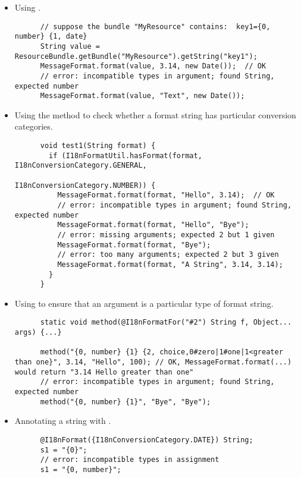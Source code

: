 \begin{itemize}
  \item Using .
\begin{Verbatim}
      // suppose the bundle "MyResource" contains:  key1={0, number} {1, date}
      String value = ResourceBundle.getBundle("MyResource").getString("key1");
      MessageFormat.format(value, 3.14, new Date());  // OK
      // error: incompatible types in argument; found String, expected number
      MessageFormat.format(value, "Text", new Date());
\end{Verbatim}
  \item Using the
    method to check whether a format
    string has particular conversion categories.
\begin{Verbatim}
      void test1(String format) {
        if (I18nFormatUtil.hasFormat(format, I18nConversionCategory.GENERAL,
                                             I18nConversionCategory.NUMBER)) {
          MessageFormat.format(format, "Hello", 3.14);  // OK
          // error: incompatible types in argument; found String, expected number
          MessageFormat.format(format, "Hello", "Bye");
          // error: missing arguments; expected 2 but 1 given
          MessageFormat.format(format, "Bye");
          // error: too many arguments; expected 2 but 3 given
          MessageFormat.format(format, "A String", 3.14, 3.14);
        }
      }
\end{Verbatim}
  \item Using 
    to ensure that an argument is a particular type of format string.
\begin{Verbatim}
      static void method(@I18nFormatFor("#2") String f, Object... args) {...}

      method("{0, number} {1} {2, choice,0#zero|1#one|1<greater than one}", 3.14, "Hello", 100); // OK, MessageFormat.format(...) would return "3.14 Hello greater than one"
      // error: incompatible types in argument; found String, expected number
      method("{0, number} {1}", "Bye", "Bye");
\end{Verbatim}
  \item Annotating a string with
    .
\begin{Verbatim}
      @I18nFormat({I18nConversionCategory.DATE}) String;
      s1 = "{0}";
      // error: incompatible types in assignment
      s1 = "{0, number}";
\end{Verbatim}
\end{itemize}

